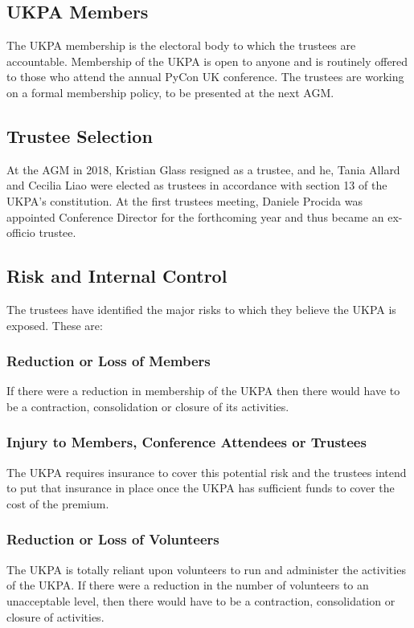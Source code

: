 \documentclass[11pt, final]{article}
\begin{document}
        \subsection{UKPA Members}
        The UKPA membership is the electoral body to which the trustees are accountable.
        Membership of the UKPA is open to anyone and is routinely offered to those who attend the annual PyCon UK conference. The trustees are working on a formal membership policy, to be presented at the next AGM.

        \subsection{Trustee Selection}
        At the AGM in 2018, Kristian Glass resigned as a trustee, and he, Tania Allard and Cecilia Liao were elected as trustees in accordance with section 13 of the UKPA's constitution. At the first trustees meeting, Daniele Procida was appointed Conference Director for the forthcoming year and thus became an ex-officio trustee.

	    \subsection{Risk and Internal Control}
        The trustees have identified the major risks to which they believe the UKPA is exposed. These are:
        
          \subsubsection{Reduction or Loss of Members}
            If there were a reduction in membership of the UKPA then there would have to be a contraction, consolidation or closure of its activities.

            \subsubsection{Injury to Members, Conference Attendees or Trustees}
            The UKPA requires insurance to cover this potential risk and the trustees intend to put that insurance in place once the UKPA has sufficient funds to cover the cost of the premium.
            
            \subsubsection{Reduction or Loss of Volunteers}
            The UKPA is totally reliant upon volunteers to run and administer the activities of the UKPA. If there were a reduction in the number of volunteers to an unacceptable level, then there would have to be a contraction, consolidation or closure of activities.
            
\end{document}
